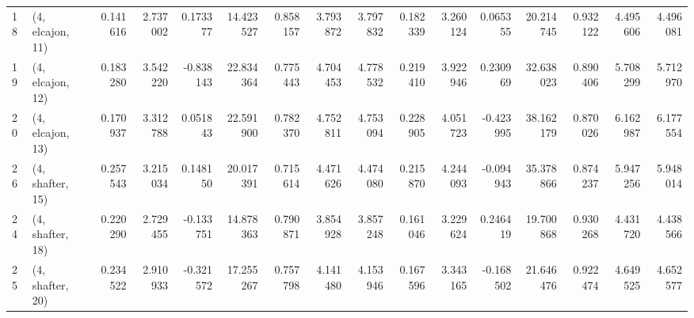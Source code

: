 \begin{tabular}{llrrrrrrrrrrrrrr}
18 &  (4, elcajon, 11) &   0.141616 &  2.737002 &  0.173377 &  14.423527 &  0.858157 &   3.793872 &  3.797832 &  0.182339 &   3.260124 &  0.065355 &   20.214745 &  0.932122 &   4.495606 &   4.496081 \\
19 &  (4, elcajon, 12) &   0.183280 &  3.542220 & -0.838143 &  22.834364 &  0.775443 &   4.704453 &  4.778532 &  0.219410 &   3.922946 &  0.230969 &   32.638023 &  0.890406 &   5.708299 &   5.712970 \\
20 &  (4, elcajon, 13) &   0.170937 &  3.312788 &  0.051843 &  22.591900 &  0.782370 &   4.752811 &  4.753094 &  0.228905 &   4.051723 & -0.423995 &   38.162179 &  0.870026 &   6.162987 &   6.177554 \\
26 &  (4, shafter, 15) &   0.257543 &  3.215034 &  0.148150 &  20.017391 &  0.715614 &   4.471626 &  4.474080 &  0.215870 &   4.244093 & -0.094943 &   35.378866 &  0.874237 &   5.947256 &   5.948014 \\
24 &  (4, shafter, 18) &   0.220290 &  2.729455 & -0.133751 &  14.878363 &  0.790871 &   3.854928 &  3.857248 &  0.161046 &   3.229624 &  0.246419 &   19.700868 &  0.930268 &   4.431720 &   4.438566 \\
25 &  (4, shafter, 20) &   0.234522 &  2.910933 & -0.321572 &  17.255267 &  0.757798 &   4.141480 &  4.153946 &  0.167596 &   3.343165 & -0.168502 &   21.646476 &  0.922474 &   4.649525 &   4.652577 \\
\bottomrule
\end{tabular}
